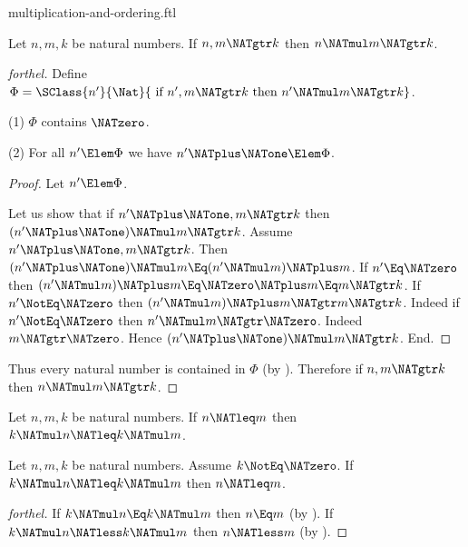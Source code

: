 \documentclass{stex}
\begin{document}
\begin{smodule}{multiplication-and-ordering.ftl}
\begin{proposition}[forthel,id=ARITHMETIC_06_1826268599287808]
  Let $n, m, k$ be natural numbers.
  If $n, m \NATgtr k$ then $n \NATmul m \NATgtr k$.
\end{proposition}
\begin{proof}[forthel]
  Define $\Phi = \SClass{n'}{\Nat}{\text{ if }n', m \NATgtr k\text{ then }n' \NATmul m \NATgtr k}$.

  (1) $\Phi$ contains $\NATzero$.

  (2) For all $n' \Elem \Phi$ we have $n' \NATplus \NATone \Elem \Phi$.
  \begin{proof}
    Let $n' \Elem \Phi$.

    Let us show that if $n' \NATplus \NATone, m \NATgtr k$ then $(n' \NATplus \NATone) \NATmul m \NATgtr k$.
      Assume $n' \NATplus \NATone, m \NATgtr k$.
      Then $(n' \NATplus \NATone) \NATmul m \Eq (n' \NATmul m) \NATplus m$.
      If $n' \Eq \NATzero$ then
      $(n' \NATmul m) \NATplus m
        \Eq \NATzero \NATplus m
        \Eq m
        \NATgtr k$.
      If $n' \NotEq \NATzero$ then
      $(n' \NATmul m) \NATplus m
        \NATgtr m
        \NATgtr k$.
      Indeed if $n' \NotEq \NATzero$ then $n' \NATmul m \NATgtr \NATzero$.
      Indeed $m \NATgtr \NATzero$.
      Hence $(n' \NATplus \NATone) \NATmul m \NATgtr k$.
    End.
  \end{proof}

  Thus every natural number is contained in $\Phi$ (by ).
  Therefore if $n, m \NATgtr k$ then $n \NATmul m \NATgtr k$.
\end{proof}

\begin{corollary}[forthel,id=ARITHMETIC_06_1751605544222720]
  Let $n, m, k$ be natural numbers.
  If $n \NATleq m$ then $k \NATmul n \NATleq k \NATmul m$.
\end{corollary}

\begin{corollary}[forthel,id=ARITHMETIC_06_3965209318260736]
  Let $n, m, k$ be natural numbers.
  Assume $k \NotEq \NATzero$.
  If $k \NATmul n \NATleq k \NATmul m$ then $n \NATleq m$.
\end{corollary}
\begin{proof}[forthel]
  If $k \NATmul n \Eq k \NATmul m$ then $n \Eq m$ (by ).
  If $k \NATmul n \NATless k \NATmul m$ then $n \NATless m$ (by ).
\end{proof}


\end{smodule}
\end{document}
